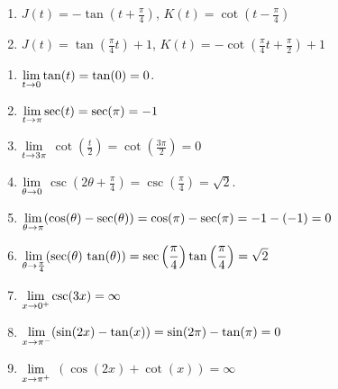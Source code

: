 \begin{multicols}{2}
\begin{enumerate}
\setcounter{enumi}{\value{HW}}

\item  $J(t) = -\tan\left(t+ \frac{\pi}{4} \right)$, $K(t) = \cot  \left(t - \frac{\pi}{4} \right)$

\item  $J(t) = \tan\left( \frac{\pi}{4} t \right) + 1$, $K(t) = -\cot\left( \frac{\pi}{4} t + \frac{\pi}{2} \right) + 1$

\setcounter{HW}{\value{enumi}}
\end{enumerate}
\end{multicols}


\begin{enumerate}
\setcounter{enumi}{\value{HW}}

\item $\displaystyle{\lim_{t \rightarrow 0} \tan(t) = \tan(0) = 0}$.

\item $\displaystyle{\lim_{t \rightarrow \pi} \sec(t) = \sec(\pi) = -1}$

\item $\displaystyle{\lim_{t \rightarrow 3\pi}}$ $\cot\left(\frac{t}{2}\right) = \cot\left(\frac{3\pi}{2}\right) = 0$

\item  $\displaystyle{\lim_{\theta \rightarrow 0}}$ $\csc\left(2\theta + \frac{\pi}{4}\right) = \csc\left(\frac{\pi}{4}\right) = \sqrt{2}$.

\item $\displaystyle{\lim_{\theta \rightarrow \pi} (\cos(\theta)  -  \sec(\theta)) = \cos(\pi) - \sec(\pi) = -1 - (-1) = 0}$

\item $\displaystyle{\lim_{\theta \rightarrow \frac{\pi}{4}} (\sec(\theta) \, \tan(\theta)) = \sec\left( \frac{\pi}{4} \right) \tan\left( \frac{\pi}{4} \right) = \sqrt{2}}$

\item  $\displaystyle{\lim_{x \rightarrow 0^{+}} \csc(3x) = \infty}$

\item $\displaystyle{\lim_{x \rightarrow \pi^{-}}  (\sin(2x)  - \tan(x))}  = \sin(2\pi) - \tan(\pi) = 0$

\item $\displaystyle{\lim_{x \rightarrow \pi^{+}}}$ $(\cos(2x) + \cot(x)) =  \infty$

\setcounter{HW}{\value{enumi}}
\end{enumerate}


